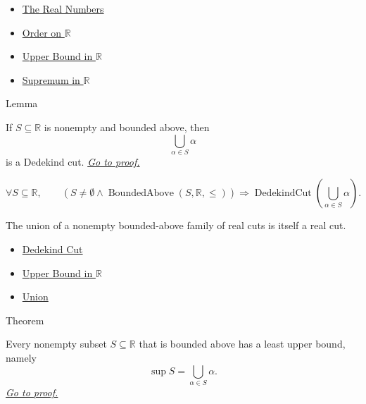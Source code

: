 \begin{dependencies}
\begin{itemize}
  \item \hyperref[def:reals]{The Real Numbers}
  \item \hyperref[def:order-on-r]{Order on $\mathbb{R}$}
  \item \hyperref[def:upper-bound-in-r]{Upper Bound in $\mathbb{R}$}
  \item \hyperref[def:supremum-in-r]{Supremum in $\mathbb{R}$}
\end{itemize}
\end{dependencies}

\begin{lemmabox}{Lemma}
\begin{lemma}
\label{lem:union-of-cuts-is-a-cut}
If $S\subseteq\mathbb{R}$ is nonempty and bounded above, then
\[
\bigcup_{\alpha\in S}\alpha
\]
is a Dedekind cut.
\hyperref[prf:union-of-cuts-is-a-cut]{\textit{Go to proof.}}
\end{lemma}
\end{lemmabox}

\begin{remark*}
\[
\forall S\subseteq\mathbb{R},\qquad
\left(S\ne\emptyset\land \operatorname{BoundedAbove}(S,\mathbb{R},\le)\right)
\Longrightarrow
\operatorname{DedekindCut}\!\left(\bigcup_{\alpha\in S}\alpha\right).
\]
\end{remark*}

\begin{remark*}[Interpretation]
The union of a nonempty bounded-above family of real cuts is itself a real cut.
\end{remark*}

\begin{dependencies}
\begin{itemize}
  \item \hyperref[def:dedekind-cut]{Dedekind Cut}
  \item \hyperref[def:upper-bound-in-r]{Upper Bound in $\mathbb{R}$}
  \item \hyperref[def:union]{Union}
\end{itemize}
\end{dependencies}

\begin{theorembox}{Theorem}
\begin{theorem}
\label{thm:lub-property-r}
Every nonempty subset $S\subseteq\mathbb{R}$ that is bounded above has a least
upper bound, namely
\[
\sup S=\bigcup_{\alpha\in S}\alpha.
\]
\hyperref[prf:lub-property-r]{\textit{Go to proof.}}
\end{theorem}
\end{theorembox}

